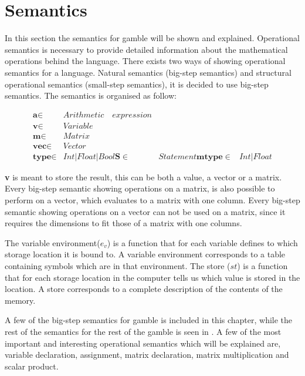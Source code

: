 \chapter{Semantics}
In this section the semantics for \gls{gamble} will be shown and explained.
Operational semantics is necessary to provide detailed information about the mathematical operations behind the language.
There exists two ways of showing operational semantics for a language.
Natural semantics (big-step semantics) and structural operational semantics (small-step semantics), it is decided to use big-step semantics.
The semantics is organised as follow:

\begin{align*}
	\textbf{a} \in  &Arithmetic\quad expression\\
	\textbf{v} \in  &Variable\\
	\textbf{m} \in  &Matrix\\
	\textbf{vec} \in  &Vector\\
	\textbf{type} \in &Int | Float | Bool
	\textbf{S}	\in &Statement
	\textbf{mtype} \in &Int | Float
\end{align*}

\textbf{v} is meant to store the result, this can be both a value, a vector or a matrix.
Every big-step semantic showing operations on a matrix, is also possible to perform on a vector, which evaluates to a matrix with one column.
Every big-step semantic showing operations on a vector can not be used on a matrix, since it requires the dimensions to fit those of a matrix with one columns.

The variable environment(${ e }_{ v }$) is a function that for each variable defines to which storage location it is bound to. A variable environment corresponds to a table containing symbols which are in that environment.
The store ($st$) is a function that for each storage location in the computer tells us which value is stored in the location. A store corresponds to a complete description of the contents of the memory.\citep{EnvSt_Semantics}

A few of the big-step semantics for \gls{gamble} is included in this chapter, while the rest of the semantics for the rest of the \gls{gamble} is seen in .
A few of the most important and interesting operational semantics which will be explained are, variable declaration, assignment, matrix declaration, matrix multiplication and scalar product.

